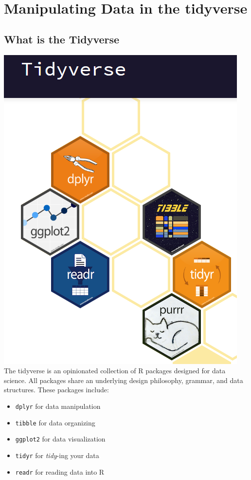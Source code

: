\documentclass[
]{book}
\providecommand{\tightlist}{%
  \setlength{\itemsep}{0pt}\setlength{\parskip}{0pt}}
\begin{document}
\chapter{Manipulating Data in the tidyverse}\label{manipulating-data-in-the-tidyverse}

\section{What is the Tidyverse}\label{what-is-the-tidyverse}

\includegraphics{./figures/tidyverse.png}
The tidyverse is an opinionated collection of R packages designed for data science. All packages share an underlying design philosophy, grammar, and data structures. These packages include:

\begin{itemize}
\tightlist
\item
  \texttt{dplyr} for data manipulation
\item
  \texttt{tibble} for data organizing
\item
  \texttt{ggplot2} for data visualization
\item
  \texttt{tidyr} for \emph{tidy}-ing your data
\item
  \texttt{readr} for reading data into R
\end{itemize}
\end{document}
